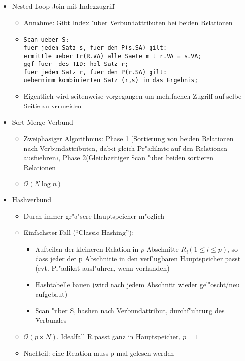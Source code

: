 \documentclass[a4paper, 12pt]{scrartcl}
\begin{document}
\begin{itemize}
	\item
		Nested Loop Join mit Indexzugriff
		\begin{itemize}
			\item
				Annahme: Gibt Index "uber Verbundattributen bei beiden Relationen
			\item
				\begin{lstlisting}
Scan ueber S;
fuer jeden Satz s, fuer den P(s.SA) gilt:
ermittle ueber Ir(R.VA) alle Saete mit r.VA = s.VA;
ggf fuer jdes TID: hol Satz r;
fuer jeden Satz r, fuer den P(r.SA) gilt:
uebernimm kombinierten Satz (r,s) in das Ergebnis;
				\end{lstlisting}
			\item
				Eigentlich wird seitenweise vorgegangen um mehrfachen Zugriff auf selbe Seitie zu vermeiden
		\end{itemize}
	\item
		Sort-Merge Verbund
		\begin{itemize}
			\item
				Zweiphasiger Algorithmus: Phase 1 (Sortierung von beiden Relationen nach Verbundattributen, dabei gleich Pr"adikate auf den Relationen ausfuehren), Phase 2(Gleichzeitiger Scan "uber beiden sortieren Relationen
			\item
				$\mathcal{O}(N \log n)$
		\end{itemize}

	\item Hashverbund
		\begin{itemize}
			\item
				Durch immer gr"o"sere Hauptspeicher m"oglich
			\item
				Einfachster Fall (\enquote{Classic Hashing}):
				\begin{itemize}
					\item
						Aufteilen der kleineren Relation in $p$ Abschnitte $R_i(1\leq i \leq p)$, so dass jeder der p Abschnitte in den verf"ugbaren Hauptspeicher passt (evt. Pr"adikat ausf"uhren, wenn vorhanden)
					\item
						Hashtabelle bauen (wird nach jedem Abschnitt wieder gel"oscht/neu aufgebaut)
					\item
						Scan "uber S, hashen nach Verbundattribut, durchf"uhrung des Verbundes
				\end{itemize}
			\item
				$\mathcal{O}(p \times N)$, Idealfall R passt ganz in Hauptspeicher, $p = 1$
			\item
				Nachteil: eine Relation muss p-mal gelesen werden
		\end{itemize}


\end{itemize}
\end{document}

